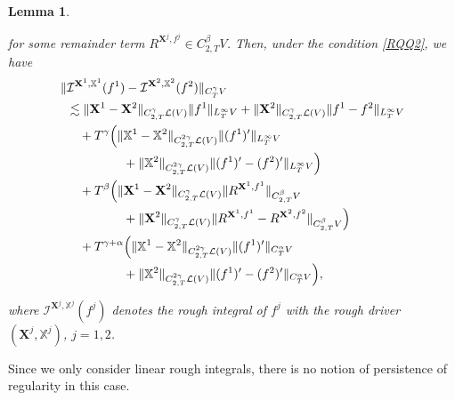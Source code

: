 \documentclass[letterpaper, 11pt,  reqno]{amsart}
\newtheorem{lemma}[theorem]{Lemma}
\newcommand{\1}{\hspace{0.5mm}\textup{I}\hspace{0.5mm}}
\newcommand{\I}{\mathcal{I}}
\newcommand{\noi}{\noindent}
\renewcommand{\L}{\mathcal{L}}
\newcommand{\al}{\alpha}
\newcommand{\be}{\beta}
\newcommand{\g}{\gamma}
\newcommand{\les}{\lesssim}
\newcommand{\XXb}{\mathbb{X}}
\newcommand{\XX}{\mathbf{X}}
\numberwithin{equation}{section}
\numberwithin{theorem}{section}
\begin{document}
\begin{lemma}
\begin{itemize}
\noi
for some remainder term
 $R^{\XX^j, f^j}
\in C^{\be}_{2, T}V$.
Then, under the condition \eqref{RQQ2}, we have 
\begin{align}
 \| & \I^{\XX^1, \XXb^1}(f^1)
- \I^{\XX^2, \XXb^2}(f^2)\|_{C^\g_T  V} 
\notag\\
& \les
\|\XX^1- \XX^2\|_{C^\g_{2,T}\L(V)}
\|f^1 \|_{L^\infty_TV}
+ \|\XX^2\|_{C^\g_{2,T}\L(V)}
\|f^1 -f^2\|_{L^\infty_TV}
\notag\\
& \quad 
+  T^{\g}
\Big(
\|\XXb^1- \XXb^2\|_{C^{2\g}_{2,T}\L(V)}
\|(f^1)' \|_{L^\infty_TV}
\notag\\
& \hphantom{XXXXX}
+ \|\XXb^2\|_{C^{2\g}_{2,T}\L(V)}
\|(f^1)'- (f^2)' \|_{L^\infty_TV}\Big)
\notag\\
& \quad 
+  T^{\be}
\Big(
\|\XX^1- \XX^2\|_{C^\g_{2,T}\L(V)}
\| R^{\XX^1, f^1}\|_{C^\be_{2,T}V}
\label{RQQ7}
\\
& \hphantom{XXXXX}
+ 
\|\XX^2\|_{C^\g_{2,T}\L(V)}
\| R^{\XX^1, f^1} - R^{\XX^2, f^2}\|_{C^\be_{2,T}V}\Big)
\notag\\
& \quad + 
 T^{\g+ \al}
\Big(
\|\XXb^1 - \XXb^2\|_{C^{2\g}_{2,T}\L(V)}
\| (f^1)'\|_{C^\al_{T}V}
\notag\\
& \hphantom{XXXXX}
+ \|\XXb^2\|_{C^{2\g}_{2,T}\L(V)}
\| (f^1)' - (f^2)'\|_{C^\al_{T}V}
\Big), 
\notag
\end{align}


\noi
where 
$\I^{\XX^j, \XXb^j}(f^j)$ denotes
 the rough integral 
 of $f^j$
 with the rough driver $(\XX^j, \XXb^j)$, 
 $j = 1, 2$.




\end{itemize}












\end{lemma}


Since we only consider linear rough integrals, 
there is no notion of persistence of regularity in this case.
\end{document}
